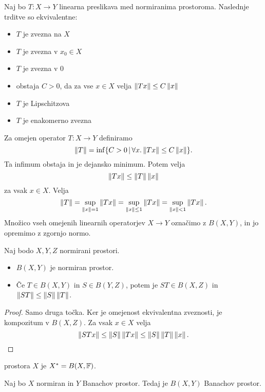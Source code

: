 
\begin{izrek}
  Naj bo $T: X \to Y$ linearna preslikava med normiranima prostoroma.
  Naslednje trditve so ekvivalentne:
  \begin{itemize}
  \item $T$ je zvezna na $X$
  \item $T$ je zvezna v $x_0 \in X$
  \item $T$ je zvezna v $0$
  \item obstaja $C > 0$, da za vse $x \in X$ velja $\left\lVert Tx\right\rVert \le C \left\lVert x\right\rVert$
  \item $T$ je Lipschitzova
  \item $T$ je enakomerno zvezna
  \end{itemize}
\end{izrek}

Za omejen operator $T: X \to Y$ definiramo
\[
  \left\lVert T\right\rVert = \inf \{ C > 0 \,|\, \forall x . \left\lVert Tx\right\rVert \le C \left\lVert x\right\rVert \}.
\]
Ta infimum obstaja in je dejansko minimum.
Potem velja
\[
  \left\lVert Tx\right\rVert \le \left\lVert T\right\rVert \left\lVert x\right\rVert
\]
za vsak $x \in X$.
Velja
\[
  \left\lVert T\right\rVert = \sup_{\left\lVert x\right\rVert = 1} \left\lVert Tx\right\rVert
  = \sup_{\left\lVert x\right\rVert \le 1} \left\lVert Tx\right\rVert
  = \sup_{\left\lVert x\right\rVert < 1} \left\lVert Tx\right\rVert.
\]
Množico vseh omejenih linearnih operatorjev $X \to Y$ označimo z $B(X,Y)$, in jo
opremimo z zgornjo normo.

\begin{trditev}
  Naj bodo $X, Y, Z$ normirani prostori.
  \begin{itemize}
  \item $B(X,Y)$ je normiran prostor.
  \item Če $T \in B(X,Y)$ in $S \in B(Y,Z)$, potem je $ST \in B(X,Z)$ in
	$\left\lVert ST\right\rVert \le \left\lVert S\right\rVert \left\lVert T\right\rVert$.
  \end{itemize}
\end{trditev}

\begin{proof}
  Samo druga točka.
  Ker je omejenost ekvivalentna zveznosti, je kompozitum v $B(X,Z)$.
  Za vsak $x \in X$ velja
  \[
	\left\lVert STx\right\rVert \le \left\lVert S\right\rVert \left\lVert Tx\right\rVert \le \left\lVert S\right\rVert \left\lVert T\right\rVert \left\lVert x\right\rVert.
	\qedhere
  \]
\end{proof}

\begin{definicija}
   prostora $X$ je $X^* = B(X, \mathbb{F})$.
\end{definicija}

\begin{izrek}
  Naj bo $X$ normiran in $Y$ Banachov prostor.
  Tedaj je $B(X,Y)$ Banachov prostor.
\end{izrek}


